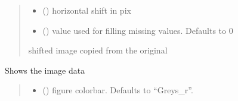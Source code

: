 \documentclass[letterpaper,10pt,english]{sphinxmanual}
\begin{document}
\begin{fulllineitems}
\begin{fulllineitems}
\begin{quote}
\begin{description}
\begin{itemize}
\item {} 
\sphinxAtStartPar
{} () \textendash{} horizontal shift in pix

\item {} 
\sphinxAtStartPar
{} (\sphinxstyleliteralemphasis{\sphinxupquote{, }}) \textendash{} value used for filling missing values. Defaults to 0

\end{itemize}

\sphinxAtStartPar
shifted image copied from the original

\sphinxAtStartPar
{\hyperref[\detokenize{micropolarray:micropolarray.image.Image}]{}}

\end{description}\end{quote}

\end{fulllineitems}


\begin{fulllineitems}
\label{\detokenize{micropolarray:micropolarray.image.Image.show}}
\pysigstartsignatures
{}
\pysigstopsignatures
\sphinxAtStartPar
Shows the image data
\begin{quote}\begin{description}
\begin{itemize}
\item {} 
\sphinxAtStartPar
{} (\sphinxstyleliteralemphasis{\sphinxupquote{, }}) \textendash{} figure colorbar. Defaults to “Greys\_r”.


\end{itemize}
\end{description}
\end{quote}
\end{fulllineitems}
\end{fulllineitems}
\end{document}
